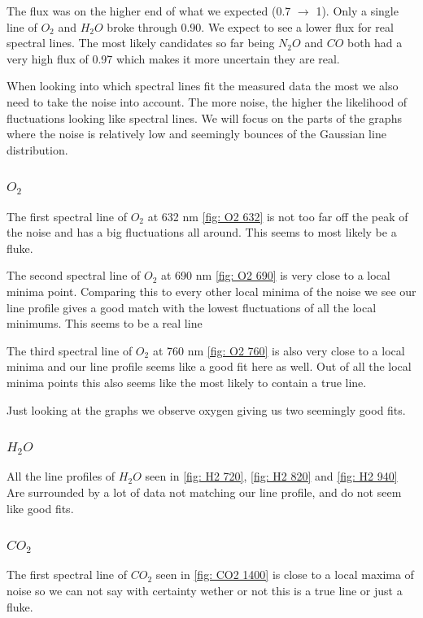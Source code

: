 \documentclass[reprint,english,notitlepage]{revtex4-2}
\begin{document}
The flux was on the higher end of what we expected (0.7 $ \rightarrow  $ 1). Only a single line of $ O_2 $ and $ H_2O $ broke through 0.90. We expect to see a lower flux for real spectral lines. The most likely candidates so far being $ N_2O $ and $ CO  $ both had a very high flux of 0.97 which makes it more uncertain they are real.
\newline

When looking into which spectral lines fit the measured data the most we also need to take the noise into account. The more noise, the higher the likelihood of fluctuations looking like spectral lines. We will focus on the parts of the graphs where the noise is relatively low and seemingly bounces of the Gaussian line distribution. 
\subsubsection*{$ O_2 $}
The first spectral line of $O_2$ at 632 nm \ref{fig: O2 632} is not too far off the peak of the noise and has a big fluctuations all around. This seems to most likely be a fluke. 

The second spectral line of $O_2$ at 690 nm \ref{fig: O2 690} is very close to a local minima point. Comparing this to every other local minima of the noise we see our line profile gives a good match with the lowest fluctuations of all the local minimums. This seems to be a real line 

The third spectral line of $O_2$ at 760 nm \ref{fig: O2 760} is also very close to a local minima and our line profile seems like a good fit here as well. Out of all the local minima points this also seems like the most likely to contain a true line. 

Just looking at the graphs we observe oxygen giving us two seemingly good fits.  

\subsubsection*{$ H_2O $}
All the line profiles of $ H_2O $ seen in \ref{fig: H2 720}, \ref{fig: H2 820} and \ref{fig: H2 940} Are surrounded by a lot of data not matching our line profile, and do not seem like good fits. 

\subsubsection*{$ CO_2 $}
The first spectral line of $ CO_2 $ seen in \ref{fig: CO2 1400} is close to a local maxima of noise so we can not say with certainty wether or not this is a true line or just a fluke. 
\end{document}
